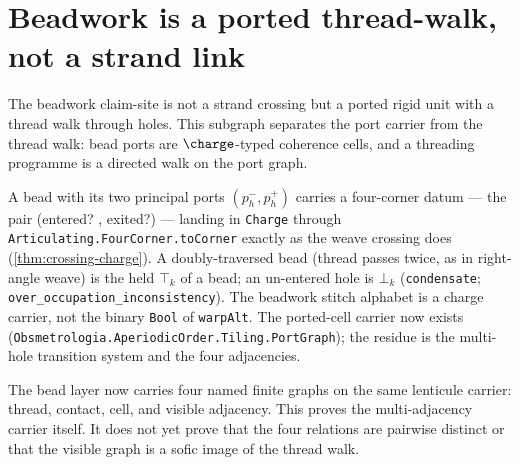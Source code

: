 \section{Beadwork is a ported thread-walk, not a strand link}

The beadwork claim-site is not a strand crossing but a ported rigid unit with a
thread walk through holes.  This subgraph separates the port carrier from the
thread walk: bead ports are $\charge$-typed coherence cells, and a threading
programme is a directed walk on the port graph.

\begin{theorem}\label{thm:bead-portgraph-carrier}\leanok{}
A bead with its two principal ports
$(p_h^-,p_h^+)$ carries a four-corner datum --- the pair (entered? , exited?) --- landing in
\texttt{Charge} through \texttt{Articulating.FourCorner.toCorner} exactly as the weave crossing does
(\cref{thm:crossing-charge}). A doubly-traversed bead (thread passes twice, as in
right-angle weave) is the held $\top_k$ of a bead; an un-entered hole is $\bot_k$
(\texttt{condensate}; \texttt{over\_occupation\_inconsistency}). The beadwork stitch alphabet is a
charge carrier, not the binary \texttt{Bool} of \texttt{warpAlt}. The ported-cell carrier now
exists (\texttt{Obsmetrologia.AperiodicOrder.Tiling.PortGraph}); the residue is the multi-hole transition system and
the four adjacencies.
\end{theorem}

\begin{theorem}\label{thm:bead-four-adjacency-carrier}\leanok{}
The bead layer now carries four named finite graphs on the same lenticule
carrier: thread, contact, cell, and visible adjacency.  This proves the
multi-adjacency carrier itself.  It does not yet prove that the four relations
are pairwise distinct or that the visible graph is a sofic image of the thread
walk.
\end{theorem}

